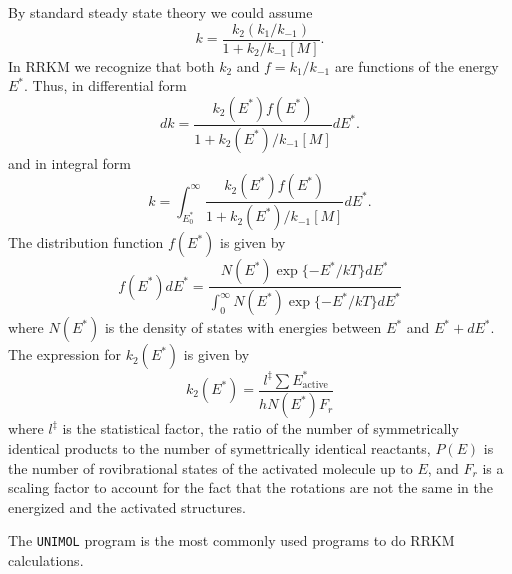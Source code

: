 By standard steady state theory we could assume
\begin{equation}
 k = \frac{k_2(k_1/k_{-1})}{1+k_2/k_{-1}[M]}.
\end{equation}
In RRKM we recognize that both $k_2$ and $f=k_1/k_{-1}$ are functions
of the energy $E^*$. Thus, in differential form
\begin{equation}
 dk = \frac{k_2(E^*)f(E^*)}{1+k_2(E^*)/k_{-1}[M]}dE^*.
\end{equation}
and in integral form
\begin{equation}
 k = \int_{E_0^*}^{\infty}\frac{k_2(E^*)f(E^*)}{1+k_2(E^*)/k_{-1}[M]}dE^*.
\end{equation}
The distribution function $f(E^*)$ is given by
\begin{equation}
 f(E^*)dE^* = \frac{N(E^*)\exp\{-E^*/kT\}dE^*}
  {\int_0^\infty N(E^*)\exp\{-E^*/kT\}dE^*}
\end{equation}
where $N(E^*)$ is the density of states with energies between $E^*$
and $E^*+dE^*$. The expression for $k_2(E^*)$ is given by
\begin{equation}
 k_2(E^*) = \frac{l^\ddag\sum E_\mathrm{active}^*}{hN(E^*)F_r}
\end{equation}
where $l^\ddag$ is the statistical factor, the ratio of the number of
symmetrically identical products to the number of symettrically
identical reactants, $P(E)$ is the number of rovibrational states of
the activated molecule up to $E$, and $F_r$ is a scaling factor to
account for the fact that the rotations are not the same in the
energized and the activated structures.

The \verb:UNIMOL: program is the most commonly used programs to do
RRKM calculations.

